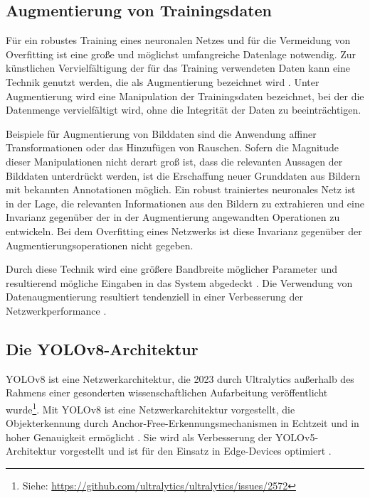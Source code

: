 
\subsection{Augmentierung von Trainingsdaten}
\label{sec:was_augmentierung}

Für ein robustes Training eines neuronalen Netzes und für die Vermeidung von Overfitting ist eine große und möglichst umfangreiche Datenlage notwendig. Zur künstlichen Vervielfältigung der für das Training verwendeten Daten kann eine Technik genutzt werden, die als Augmentierung bezeichnet wird \cite{cv_general}. Unter Augmentierung wird eine Manipulation der Trainingsdaten bezeichnet, bei der die Datenmenge vervielfältigt wird, ohne die Integrität der Daten zu beeinträchtigen.

Beispiele für Augmentierung von Bilddaten sind die Anwendung affiner Transformationen oder das Hinzufügen von Rauschen. Sofern die Magnitude dieser Manipulationen nicht derart groß ist, dass die relevanten Aussagen der Bilddaten unterdrückt werden, ist die Erschaffung neuer Grunddaten aus Bildern mit bekannten Annotationen möglich. Ein robust trainiertes neuronales Netz ist in der Lage, die relevanten Informationen aus den Bildern zu extrahieren und eine Invarianz gegenüber der in der Augmentierung angewandten Operationen zu entwickeln. Bei dem Overfitting eines Netzwerks ist diese Invarianz gegenüber der Augmentierungsoperationen nicht gegeben.

Durch diese Technik wird eine größere Bandbreite möglicher Parameter und resultierend mögliche Eingaben in das System abgedeckt \cite{augmentierung, augmentation_max_likelihood_est}. Die Verwendung von Datenaugmentierung resultiert tendenziell in einer Verbesserung der Netzwerkperformance \cite{augmentierung_auswirking}.


\newpage
\subsection{Die YOLOv8-Architektur}
\label{sec:was_yolov8}

YOLOv8 ist eine Netzwerkarchitektur, die 2023 durch Ultralytics außerhalb des Rahmens einer gesonderten wissenschaftlichen Aufarbeitung veröffentlicht wurde\footnote{Siehe: \url{https://github.com/ultralytics/ultralytics/issues/2572}}. Mit YOLOv8 ist eine Netzwerkarchitektur vorgestellt, die Objekterkennung durch Anchor-Free-Erkennungsmechanismen in Echtzeit und in hoher Genauigkeit ermöglicht \cite{yolov1_to_yolov8}. Sie wird als Verbesserung der YOLOv5-Architektur vorgestellt und ist für den Einsatz in Edge-Devices optimiert \cite{yolov8_comparison}.

